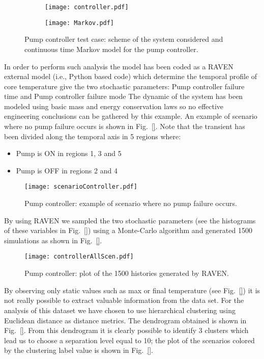 \begin{figure}
  \begin{subfigure}{.5\linewidth}
    \centering
    \texttt{[image: controller.pdf]}
  \end{subfigure}%
  \begin{subfigure}{.5\linewidth}
    \centering
    \texttt{[image: Markov.pdf]}
  \end{subfigure}
  \caption{Pump controller test case: scheme of the system considered and continuous time Markov model for the pump controller.}
  \label{fig:pumpController}
\end{figure}

In order to perform such analysis the model has been coded as a RAVEN external model (i.e., Python based code) 
which determine the temporal profile of core temperature give the two stochastic parameters: Pump controller 
failure time and Pump controller failure mode
The dynamic of the system has been modeled using basic mass and energy conservation laws so no effective 
engineering conclusions can be gathered by this example. An example of scenario where no pump failure occurs 
is shown in Fig.~\ref{}. Note that the transient has been divided along the temporal axis in 5 regions where:
\begin{itemize}
  \item Pump is ON in regions 1, 3 and 5
  \item Pump is OFF in regions 2 and 4
\end{itemize}

\begin{figure}
    \centering
    \centerline{\texttt{[image: scenarioController.pdf]}} 
    \caption{Pump controller: example of scenario where no pump failure occurs.}
    \label{fig:scenarioController}
\end{figure}

By using RAVEN we sampled the two stochastic parameters (see the histograms of these variables in Fig.~\ref{}) 
using a Monte-Carlo algorithm and generated 1500 simulations as shown in Fig.~\ref{}.

\begin{figure}
    \centering
    \centerline{\texttt{[image: controllerAllScen.pdf]}} 
    \caption{Pump controller: plot of the 1500 histories generated by RAVEN.}
    \label{fig:controllerAllScen}
\end{figure}

By observing only static values such as max or final temperature (see Fig.~\ref{}) it is not really possible to 
extract valuable information from the data set. 
For the analysis of this dataset we have chosen to use hierarchical clustering using Euclidean distance as 
distance metrics. The dendrogram obtained is shown in Fig.~\ref{}. From this dendrogram it is
clearly possible to identify 3 clusters which lead us to choose a separation level equal to 10; 
the plot of the scenarios colored by the clustering label value is shown in Fig.~\ref{}.

